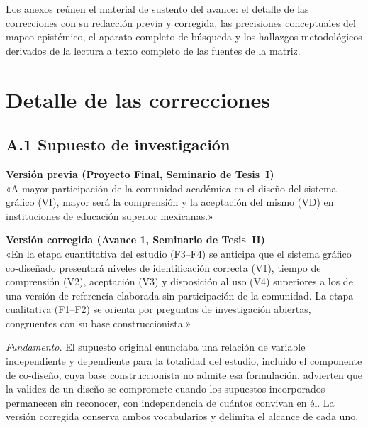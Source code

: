 \documentclass[letter,12pt]{article}
\begin{document}
\vspace{0.3cm}
\noindent Los anexos reúnen el material de sustento del avance: el detalle de las correcciones con su redacción previa y corregida, las precisiones conceptuales del mapeo epistémico, el aparato completo de búsqueda y los hallazgos metodológicos derivados de la lectura a texto completo de las fuentes de la matriz.

\section{Detalle de las correcciones}\label{anx:correcciones}

\subsection*{A.1 Supuesto de investigación}

\begin{mdframed}[style=cajaOriginal]
\textbf{\textcolor{colorOriginal}{Versión previa (Proyecto Final, Seminario de Tesis~I)}}\\[4pt]
«A mayor participación de la comunidad académica en el diseño del sistema gráfico (VI), mayor será la comprensión y la aceptación del mismo (VD) en instituciones de educación superior mexicanas.»
\end{mdframed}

\begin{mdframed}[style=cajaPropuesta]
\textbf{\textcolor{colorPropuesto}{Versión corregida (Avance 1, Seminario de Tesis~II)}}\\[4pt]
«En la etapa cuantitativa del estudio (F3--F4) se anticipa que el sistema gráfico co-diseñado presentará niveles de identificación correcta (V1), tiempo de comprensión (V2), aceptación (V3) y disposición al uso (V4) superiores a los de una versión de referencia elaborada sin participación de la comunidad. La etapa cualitativa (F1--F2) se orienta por preguntas de investigación abiertas, congruentes con su base construccionista.»
\end{mdframed}

\noindent\textit{Fundamento.} El supuesto original enunciaba una relación de variable independiente y dependiente para la totalidad del estudio, incluido el componente de co-diseño, cuya base construccionista no admite esa formulación. \citet{moonblackman2014} advierten que la validez de un diseño se compromete cuando los supuestos incorporados permanecen sin reconocer, con independencia de cuántos convivan en él. La versión corregida conserva ambos vocabularios y delimita el alcance de cada uno.
\end{document}
